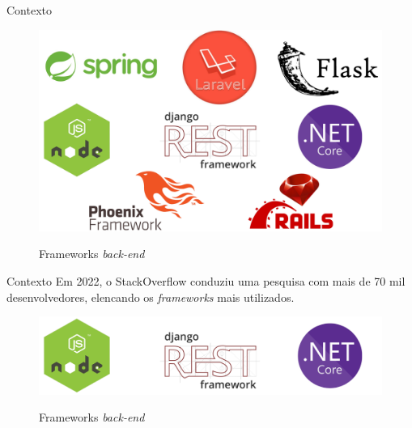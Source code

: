 \documentclass{libs/ufc_format}
\begin{document}
\begin{frame}{Contexto}
    \begin{figure}[H]
        \centering
        \caption{Frameworks \textit{back-end}}
        \includegraphics[width=0.9\linewidth]{figuras/tech-backend.pdf}
        \captionsetup{justification=centering}
        \label{fig:tech-backend}    
    \end{figure}
\end{frame}

\begin{frame}{Contexto}
    Em 2022, o StackOverflow conduziu uma pesquisa com mais de 70 mil desenvolvedores, elencando os \textit{frameworks} mais utilizados\nocite{StackOverflowSurvey}\let\thefootnote\relax{}.
    \begin{figure}[H]
        \centering
        \caption{Frameworks \textit{back-end}}
        \includegraphics[width=0.9\linewidth]{figuras/tech-backend-selecionadas.pdf}
        \captionsetup{justification=centering}
        \label{fig:tech-backend2}    
    \end{figure}
\end{frame}
\end{document}
